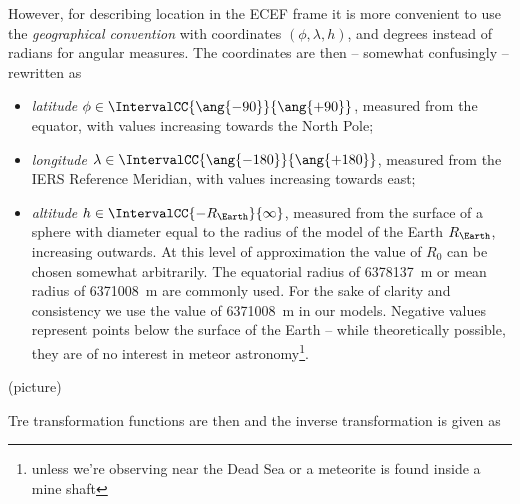         However, for describing location in the ECEF frame it is more convenient
        to use the \emph{geographical convention} with coordinates $(\phi, \lambda, h)$, and degrees
        instead of radians for angular measures. The coordinates are then -- somewhat
        confusingly -- rewritten as
        \begin{itemize}
            \item \emph{latitude} $\phi \in \IntervalCC{\ang{-90}}{\ang{+90}}$,
                measured from the equator, with values increasing towards the North Pole;
            \item \emph{longitude} $\lambda \in \IntervalCC{\ang{-180}}{\ang{+180}}$,
                measured from the IERS Reference Meridian, with values increasing towards east;
            \item \emph{altitude} $h \in \IntervalCC{-R_\Earth}{\infty}$,
                measured from the surface of a sphere with diameter equal to the radius
                of the model of the Earth $R_\Earth$, increasing outwards.
                At this level of approximation the value of $R_0$ can be chosen somewhat arbitrarily.
                The equatorial radius of \SI{6378137}{\metre} or mean radius of \SI{6371008}{\metre} are commonly used.
                For the sake of clarity and consistency we use the value of \SI{6371008}{\metre} in our models.
                Negative values represent points below the surface of the Earth --
                while theoretically possible, they are of no interest in meteor
                astronomy\footnote{unless we're observing near the Dead Sea
                or a meteorite is found inside a mine shaft}.
        \end{itemize}

        (picture)

        Tre transformation functions are then
        and the inverse transformation is given as

